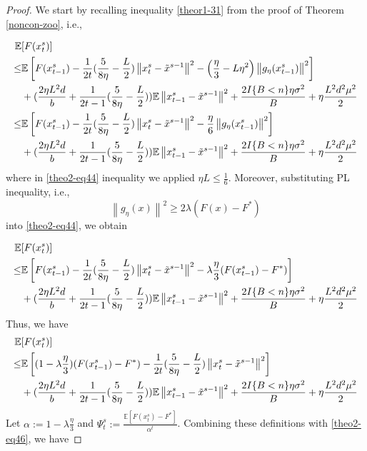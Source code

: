 \documentclass{article}
\newcommand*{\E}{\mathbb{E}}
\newcommand{\norm}[1]{\left\lVert#1\right\rVert}
\theoremstyle{definition}
\theoremstyle{remark}
\begin{document}
\begin{proof}
We start by recalling inequality \eqref{theor1-31} from the proof of Theorem \ref{noncon-zoo}, i.e.,

{\color{Brown}
\begin{align} 
\E&[F({x}_{t}^s)] \notag
\\ \leq& \E\left[F({x}_{t-1}^s)  -\frac{1}{2t}(\frac{5}{8\eta} - \frac{L}{2})\norm{{x}_t^s-\tilde{x}^{s-1}}^2- \left(\frac{\eta}{3}-L\eta^2\right)\norm{g_{\eta}(x_{t-1}^s)}^2\right]\notag\\
&+(\frac{2\eta L^2 d}{b}+\frac{1}{2t-1}(\frac{5}{8\eta} - \frac{L}{2}))\E\norm{x_{t-1}^s-\tilde{x}^{s-1}}^2
+ \frac{2I\{B < n\}\eta \sigma ^2}{B}+\eta \frac{L^2 d^2 \mu^2}{2}\notag
\\ \leq& \E\left[F({x}_{t-1}^s)  -\frac{1}{2t}(\frac{5}{8\eta} - \frac{L}{2})\norm{{x}_t^s-\tilde{x}^{s-1}}^2- \frac{\eta}{6}\norm{g_{\eta}(x_{t-1}^s)}^2\right]\notag\\
&+(\frac{2\eta L^2 d}{b}+\frac{1}{2t-1}(\frac{5}{8\eta} - \frac{L}{2}))\E\norm{x_{t-1}^s-\tilde{x}^{s-1}}^2
+ \frac{2I\{B < n\}\eta \sigma ^2}{B}+\eta \frac{L^2 d^2 \mu^2}{2}\label{theo2-eq44}
 \end{align}
 where in \eqref{theo2-eq44} inequality we applied $\eta L \leq \frac{1}{6}$.
 }
Moreover, substituting PL inequality, i.e., 
\begin{equation}
\norm{g_{\eta}(x)}^2 \geq 2\lambda (F(x) - F^*)
\end{equation}
into \eqref{theo2-eq44}, we obtain

{\color{Brown}
\begin{align} 
\E&[F({x}_{t}^s)] \notag
\\ \leq& \E\left[F({x}_{t-1}^s)  -\frac{1}{2t}(\frac{5}{8\eta} - \frac{L}{2})\norm{{x}_t^s-\tilde{x}^{s-1}}^2- \lambda\frac{\eta}{3}(F({x}_{t-1}^s) - F^*) \right]\notag\\
&+(\frac{2\eta L^2 d}{b}+\frac{1}{2t-1}(\frac{5}{8\eta} - \frac{L}{2}))\E\norm{x_{t-1}^s-\tilde{x}^{s-1}}^2
+ \frac{2I\{B < n\}\eta \sigma ^2}{B}+\eta \frac{L^2 d^2 \mu^2}{2}
 \end{align}
 }
Thus, we have
{\color{Brown}
\begin{align} 
\E&[F({x}_{t}^s)] \notag
\\ \leq& \E\left[ (1-\lambda\frac{\eta}{3})(F({x}_{t-1}^s) - F^*)   -\frac{1}{2t}(\frac{5}{8\eta} - \frac{L}{2})\norm{{x}_t^s-\tilde{x}^{s-1}}^2\right]\notag\\
&+(\frac{2\eta L^2 d}{b}+\frac{1}{2t-1}(\frac{5}{8\eta} - \frac{L}{2}))\E\norm{x_{t-1}^s-\tilde{x}^{s-1}}^2
+ \frac{2I\{B < n\}\eta \sigma ^2}{B}+\eta \frac{L^2 d^2 \mu^2}{2}\label{theo2-eq46}
 \end{align}
 }
Let {\color{Brown}$\alpha := 1 - \lambda\frac{\eta}{3}$} and $\Psi_t^s := \frac{\E[F({x}_{t}^s)-F^*]}{\alpha^t}$. Combining these definitions with \eqref{theo2-eq46}, we have  


\end{proof}
\end{document}
